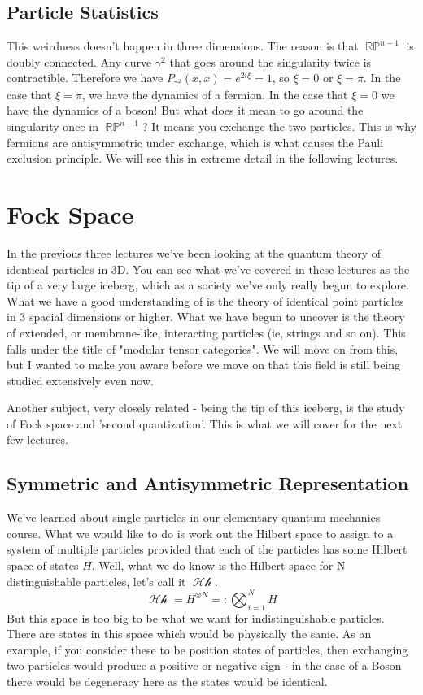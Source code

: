 \documentclass{article}
\DeclareMathOperator{\Hh}{\mathcal{Hh}}
\DeclareMathOperator{\RP}{\mathbb{RP}}
\begin{document}
\subsection{Particle Statistics}

This weirdness doesn't happen in three dimensions. The reason is that $\RP^{n-1}$ is doubly connected. Any curve $\gamma^2$ that goes around the singularity twice is contractible. Therefore we have $P_{\gamma^2}(x,x) = e^{2i\xi}=1$, so $\xi = 0$ or $\xi = \pi$. In the case that $\xi = \pi$, we have the dynamics of a fermion. In the case that $\xi = 0$ we have the dynamics of a boson! But what does it mean to go around the singularity once in $\RP^{n-1}$? It means you exchange the two particles. This is why fermions are antisymmetric under exchange, which is what causes the Pauli exclusion principle. We will see this in extreme detail in the following lectures.

\section{Fock Space}
In the previous three lectures we've been looking at the quantum theory of identical particles in 3D. You can see what we've covered in these lectures as the tip of a very large iceberg, which as a society we've only really begun to explore. What we have a good understanding of is the theory of identical point particles in 3 spacial dimensions or higher. What we have begun to uncover is the theory of extended, or membrane-like, interacting particles (ie, strings and so on). This falls under the title of "modular tensor categories". We will move on from this, but I wanted to make you aware before we move on that this field is still being studied extensively even now.

Another subject, very closely related - being the tip of this iceberg, is the study of Fock space and 'second quantization'. This is what we will cover for the next few lectures.

\subsection{Symmetric and Antisymmetric Representation}

We've learned about single particles in our elementary quantum mechanics course. What we would like to do is work out the Hilbert space to assign to a system of multiple particles provided that each of the particles has some Hilbert space of states $H$. Well, what we do know is the Hilbert space for N distinguishable particles, let's call it $\Hh$.
\begin{equation}
\Hh = H^{\otimes N} =: \bigotimes_{i=1}^N H
\end{equation}
But this space is too big to be what we want for indistinguishable particles. There are states in this space which would be physically the same. As an example, if you consider these to be position states of particles, then exchanging two particles would produce a positive or negative sign - in the case of a Boson there would be degeneracy here as the states would be identical.
\end{document}
